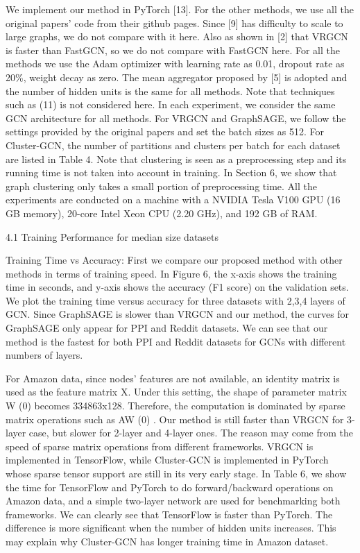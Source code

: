 \documentclass[
]{book}
\begin{document}
{{{We implement our method in PyTorch {[}13{]}. For the other methods, we use all the original papers' code from their github pages. Since {[}9{]} has difficulty to scale to large graphs, we do not compare with it here. Also as shown in {[}2{]} that VRGCN is faster than FastGCN, so we do not compare with FastGCN here. For all the methods we use the Adam optimizer with learning rate as 0.01, dropout rate as 20\%, weight decay as zero. The mean aggregator proposed by {[}5{]} is adopted and the number of hidden units is the same for all methods. Note that techniques such as (11) is not considered here. In each experiment, we consider the same GCN architecture for all methods. For VRGCN and GraphSAGE, we follow the settings provided by the original papers and set the batch sizes as 512. For Cluster-GCN, the number of partitions and clusters per batch for each dataset are listed in Table 4. Note that clustering is seen as a preprocessing step and its running time is not taken into account in training. In Section 6, we show that graph clustering only takes a small portion of preprocessing time. All the experiments are conducted on a machine with a NVIDIA Tesla V100 GPU (16 GB memory), 20-core Intel Xeon CPU (2.20 GHz), and 192 GB of RAM.

4.1 Training Performance for median size datasets

Training Time vs Accuracy: First we compare our proposed method with other methods in terms of training speed. In Figure 6, the x-axis shows the training time in seconds, and y-axis shows the accuracy (F1 score) on the validation sets. We plot the training time versus accuracy for three datasets with 2,3,4 layers of GCN. Since GraphSAGE is slower than VRGCN and our method, the curves for GraphSAGE only appear for PPI and Reddit datasets. We can see that our method is the fastest for both PPI and Reddit datasets for GCNs with different numbers of layers.

For Amazon data, since nodes' features are not available, an identity matrix is used as the feature matrix X. Under this setting, the shape of parameter matrix W (0) becomes 334863x128. Therefore, the computation is dominated by sparse matrix operations such as AW (0) . Our method is still faster than VRGCN for 3-layer case, but slower for 2-layer and 4-layer ones. The reason may come from the speed of sparse matrix operations from different frameworks. VRGCN is implemented in TensorFlow, while Cluster-GCN is implemented in PyTorch whose sparse tensor support are still in its very early stage. In Table 6, we show the time for TensorFlow and PyTorch to do forward/backward operations on Amazon data, and a simple two-layer network are used for benchmarking both frameworks. We can clearly see that TensorFlow is faster than PyTorch. The difference is more significant when the number of hidden units increases. This may explain why Cluster-GCN has longer training time in Amazon dataset.

}}}
\end{document}
